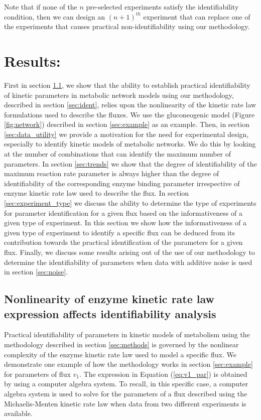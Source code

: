 \documentclass[10pt]{article}
\begin{document}
Note that if none of the $n$ pre-selected experiments satisfy the identifiability condition, then we can design an $(n+1)^{th}$ experiment that can replace one of the experiments that causes practical non-identifiability using our methodology. 

\section{Results:}
First in section \ref{sec:closedform}, we show that the ability to establish practical identifiability of kinetic parameters in metabolic network models using our methodology, described in section \ref{sec:ident}, relies upon the nonlinearity of the kinetic rate law formulations used to describe the fluxes. We use the gluconeogenic model (Figure \ref{fig:network}) described in section \ref{sec:example} as an example. 
Then, in section \ref{sec:data_utility} we provide a motivation for the need for experimental design, especially to identify kinetic models of metabolic networks. We do this by looking at the number of combinations that can identify the maximum number of parameters. 
In section \ref{sec:trends} we show that the degree of identifiability of the maximum reaction rate parameter is always higher than the degree of identifiability of the corresponding enzyme binding parameter irrespective of enzyme kinetic rate law used to describe the flux. 
In section \ref{sec:experiment_type} we discuss the ability to determine the type of experiments for parameter identification for a given flux based on the informativeness of a given type of experiment. In this section we show how the informativeness of a given type of experiment to identify a specific flux can be deduced from its contribution towards the practical identification of the parameters for a given flux. Finally, we discuss some results arising out of the use of our methodology to determine the identifiability of parameters when data with additive noise is used in section \ref{sec:noise}.

\subsection{Nonlinearity of enzyme kinetic rate law expression affects identifiability analysis}\label{sec:closedform}
Practical identifiability of parameters in kinetic models of metabolism using the methodology described in section \ref{sec:methods} is governed by the nonlinear complexity of the enzyme kinetic rate law used to model a specific flux. We demonstrate one example of how the methodology works in section \ref{sec:example} for parameters of flux $v_1$. The expression in Equation (\ref{eq:v1_par}) is obtained by using a computer algebra system. To recall, in this specific case, a computer algebra system is used to solve for the parameters of a flux described using the Michaelis-Menten kinetic rate law when data from two different experiments is available. 
\end{document}
